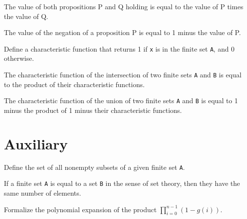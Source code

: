 \begin{lemma}\label{toInt_and}
  \leanok
  The value of both propositions P and Q holding is equal to the value of P times the value of Q.
\end{lemma}

\begin{lemma}\label{toInt_not}
  \leanok
  The value of the negation of a proposition P is equal to 1 minus the value of P.
\end{lemma}

\begin{definition}\label{char_fun}
  \leanok
  Define a characteristic function that returns 1 if \verb|x| is in the finite set \verb|A|, and 0 otherwise.
\end{definition}

\begin{lemma}\label{char_fun_inter}
  The characteristic function of the intersection of two finite sets \verb|A| and \verb|B| is equal to the product of their characteristic functions.
\end{lemma}

\begin{lemma}\label{char_fun_union}
  The characteristic function of the union of two finite sets \verb|A| and \verb|B| is equal to 1 minus the product of 1 minus their characteristic functions.
\end{lemma}
\section{Auxiliary}

\begin{definition}\label{Finset.powerset₀}
  \leanok
  Define the set of all nonempty subsets of a given finite set \verb|A|.
\end{definition}

\begin{lemma}\label{card_eq}
  \leanok
  If a finite set \verb|A| is equal to a set \verb|B| in the sense of set theory, then they have the same number of elements.
\end{lemma}

\begin{lemma}\label{mul_expand₃}
  \leanok
  Formalize the polynomial expansion of the product \(\prod_{i=0}^{n-1} (1 - g(i))\).
\end{lemma}

